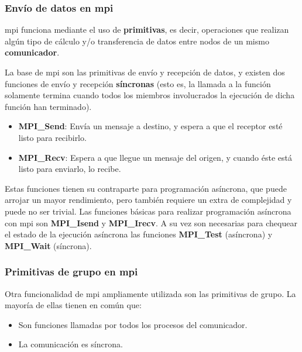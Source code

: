 \subsubsection{Envío de datos en \acrshort{mpi}}
\acrshort{mpi} funciona mediante el uso de \textbf{primitivas}, es decir, operaciones que realizan algún tipo de cálculo y/o transferencia de datos entre nodos de un mismo \textbf{comunicador}.

La base de \acrshort{mpi} son las primitivas de envío y recepción de datos, y existen dos funciones de envío y recepción \textbf{síncronas} (esto es, la llamada a la función solamente termina cuando todos los miembros involucrados la ejecución de dicha función han terminado).
\begin{itemize}
  \item \textbf{MPI\_Send}: Envía un mensaje a destino, y espera a que el receptor esté listo para recibirlo. 
  \item \textbf{MPI\_Recv}: Espera a que llegue un mensaje del origen, y cuando éste está listo para enviarlo, lo recibe.
\end{itemize}

Estas funciones tienen su contraparte para programación asíncrona, que puede arrojar un mayor rendimiento, pero también requiere un extra de complejidad y puede no ser trivial. Las funciones básicas para realizar programación asíncrona con \acrshort{mpi} son \textbf{MPI\_Isend} y \textbf{MPI\_Irecv}. A su vez son necesarias para chequear el estado de la ejecución asíncrona las funciones \textbf{MPI\_Test} (asíncrona) y \textbf{MPI\_Wait} (síncrona).

\subsubsection{Primitivas de grupo en \acrshort{mpi}}
Otra funcionalidad de \acrshort{mpi} ampliamente utilizada son las primitivas de grupo. La mayoría de ellas tienen en común que:
\begin{itemize}
  \item Son funciones llamadas por todos los procesos del comunicador.
  \item La comunicación es síncrona.
\end{itemize}

